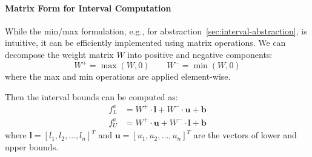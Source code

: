 \documentclass[oneside,11pt,dvipsnames]{book}
\numberwithin{equation}{section}
\theoremstyle{definition}
\theoremstyle{remark}
\newcommand{\tool}{\texttt{NeuralSAT}}
\begin{document}


\paragraph{Matrix Form for Interval Computation}

While the min/max formulation, e.g., for abstraction~\autoref{sec:interval-abstraction}, is intuitive, it can be efficiently implemented using matrix operations.
We can decompose the weight matrix $W$ into positive and negative components:
\[
W^+ = \max(W, 0) \qquad W^- = \min(W, 0)
\]
where the max and min operations are applied element-wise.

Then the interval bounds can be computed as:
\[
\begin{aligned}
f^a_L &= W^+ \cdot \mathbf{l} + W^- \cdot \mathbf{u} + \mathbf{b}\\
f^a_U &= W^+ \cdot \mathbf{u} + W^- \cdot \mathbf{l} + \mathbf{b}
\end{aligned}
\]
where $\mathbf{l} = [l_1, l_2, \ldots, l_n]^T$ and $\mathbf{u} = [u_1, u_2, \ldots, u_n]^T$ are the vectors of lower and upper bounds.
\end{document}
